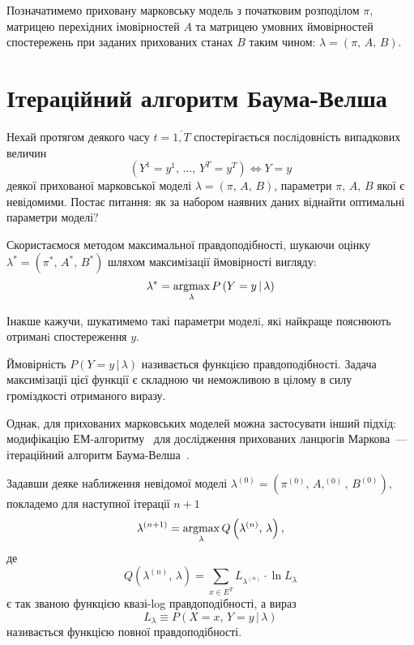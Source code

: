 Позначатимемо приховану марковську модель з початковим розподілом $\pi$, матрицею перехідних імовірностей $A$ та матрицею умовних ймовірностей спостережень при заданих прихованих станах $B$ таким чином: $\lambda=(\pi,\,A,\,B)$.

\section{Ітераційний алгоритм Баума-Велша}

Нехай протягом деякого часу $t=\overline{1,T}$ спостерігається послiдовність випадкових величин 
\begin{equation*}
    \left( Y^1=y^1,\,\ldots,\,Y^T=y^T \right) \Longleftrightarrow Y=y
\end{equation*}
деякої прихованої марковської моделі $\lambda=(\pi,\,A,\,B)$, параметри $\pi,\,A,\,B$ якої є невідомими. Постає питання: як за набором наявних даних віднайти оптимальні параметри моделі?

Скористаємося методом максимальної правдоподібності, шукаючи оцінку $\lambda^*=(\pi^*,\,A^*,\,B^*)$ шляхом максимізації ймовірності вигляду:
\begin{equation}\label{eq: likelihood function}
    \lambda^{*}=\operatorname*{argmax}\limits_{\lambda} P\left( Y=y \,|\, \lambda \right)
\end{equation}

Інакше кажучи, шукатимемо такі параметри моделi, якi найкраще пояснюють отриманi спостереження $y$. 

Ймовірність $P\left( Y=y \,|\, \lambda \right)$ називається функцією правдоподібності. Задача максимізації цієї функції є складною чи неможливою в цілому в силу громіздкості отриманого виразу.

Однак, для прихованих марковських моделей можна застосувати інший підхід: модифікацію ЕМ-алгоритму~\cite[розділ 4]{Koski2001} для дослідження прихованих ланцюгів Маркова~--- ітераційний алгоритм Баума-Велша~\cite[розділ 15]{Koski2001}. 

Задавши деяке наближення невідомої моделі $\lambda^{(0)}=(\pi^{(0)},\,A,^{(0)},\,B^{(0)})$, покладемо для наступної ітерації $n+1$
\begin{equation*}
    \lambda^{(n+1)} = \operatorname*{argmax}\limits_{\lambda} Q\left( \lambda^{(n)},\,\lambda \right),
\end{equation*}
де
\begin{equation}\label{eq: Q quasi-log likelihood function}
    Q\left( \lambda^{(n)},\,\lambda \right) = \sum\limits_{x \in E^T}L_{\lambda^{(n)}}\cdot\ln L_{\lambda}
\end{equation}
є так званою функцією квазі-log правдоподібності, а вираз
\begin{equation*}
    L_{\lambda} \equiv P\left( X=x,\,Y=y \,|\, \lambda \right)
\end{equation*}
називається функцією повної правдоподібності.

